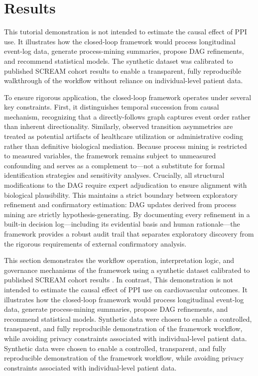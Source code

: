 \documentclass[sn-vancouver-num]{sn-jnl}
\begin{document}
\section{Results}

This tutorial demonstration is not intended to estimate the causal effect of PPI use. It illustrates how the closed-loop framework would process longitudinal event-log data, generate process-mining summaries, propose DAG refinements, and recommend statistical models. The synthetic dataset was calibrated to published SCREAM cohort results to enable a transparent, fully reproducible walkthrough of the workflow without reliance on individual-level patient data.

To ensure rigorous application, the closed-loop framework operates under several key constraints. First, it distinguishes temporal succession from causal mechanism, recognizing that a directly-follows graph captures event order rather than inherent directionality. Similarly, observed transition asymmetries are treated as potential artifacts of healthcare utilization or administrative coding rather than definitive biological mediation. Because process mining is restricted to measured variables, the framework remains subject to unmeasured confounding and serves as a complement to---not a substitute for formal identification strategies and sensitivity analyses. Crucially, all structural modifications to the DAG require expert adjudication to ensure alignment with biological plausibility. This maintains a strict boundary between exploratory refinement and confirmatory estimation: DAG updates derived from process mining are strictly hypothesis-generating. By documenting every refinement in a built-in decision log---including its evidential basis and human rationale---the framework provides a robust audit trail that separates exploratory discovery from the rigorous requirements of external confirmatory analysis. 

This section demonstrates the workflow operation, interpretation logic, and governance mechanisms of the framework using a synthetic dataset calibrated to published SCREAM cohort results \citep{chen2025}. In contrast, This demonstration is not intended to estimate the causal effect of PPI use on cardiovascular outcomes. It illustrates how the closed-loop framework would process longitudinal event-log data, generate process-mining summaries, propose DAG refinements, and recommend statistical models. Synthetic data were chosen to enable a controlled, transparent, and fully reproducible demonstration of the framework workflow, while avoiding privacy constraints associated with individual-level patient data. Synthetic data were chosen to enable a controlled, transparent, and fully reproducible demonstration of the framework workflow, while avoiding privacy constraints associated with individual-level patient data. 
\end{document}
